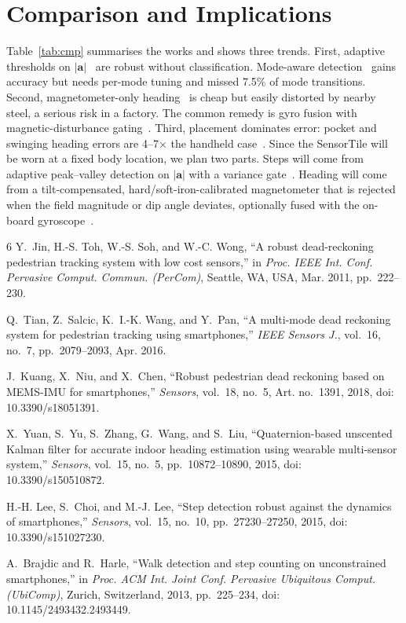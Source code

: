 \section{Comparison and Implications}
Table~\ref{tab:cmp} summarises the works and shows three trends. First,
adaptive thresholds on $|\mathbf{a}|$~\cite{lee2015} are robust without
classification. Mode-aware detection~\cite{tian2016} gains accuracy but
needs per-mode tuning and missed 7.5\% of mode transitions. Second,
magnetometer-only heading~\cite{jin2011} is cheap but easily distorted
by nearby steel, a serious risk in a factory. The common remedy is gyro
fusion with magnetic-disturbance gating~\cite{yuan2015,kuang2018}.
Third, placement dominates error: pocket and swinging heading errors are
4--7$\times$ the handheld case~\cite{kuang2018}. Since the SensorTile
will be worn at a fixed body location, we plan two parts. Steps will
come from adaptive peak--valley detection on $|\mathbf{a}|$ with a
variance gate~\cite{lee2015,brajdic2013}. Heading will come from a
tilt-compensated, hard/soft-iron-calibrated magnetometer that is
rejected when the field magnitude or dip angle deviates, optionally
fused with the on-board gyroscope~\cite{yuan2015,kuang2018}.

\begin{thebibliography}{6}
Y.~Jin, H.-S. Toh, W.-S. Soh, and W.-C. Wong, ``A robust dead-reckoning
pedestrian tracking system with low cost sensors,'' in \emph{Proc. IEEE
Int. Conf. Pervasive Comput. Commun. (PerCom)}, Seattle, WA, USA, Mar.
2011, pp.~222--230.

Q.~Tian, Z.~Salcic, K.~I.-K. Wang, and Y.~Pan, ``A multi-mode dead
reckoning system for pedestrian tracking using smartphones,'' \emph{IEEE
Sensors J.}, vol.~16, no.~7, pp.~2079--2093, Apr. 2016.

J.~Kuang, X.~Niu, and X.~Chen, ``Robust pedestrian dead reckoning based
on MEMS-IMU for smartphones,'' \emph{Sensors}, vol.~18, no.~5, Art.
no.~1391, 2018, doi: 10.3390/s18051391.

X.~Yuan, S.~Yu, S.~Zhang, G.~Wang, and S.~Liu, ``Quaternion-based
unscented Kalman filter for accurate indoor heading estimation using
wearable multi-sensor system,'' \emph{Sensors}, vol.~15, no.~5,
pp.~10872--10890, 2015, doi: 10.3390/s150510872.

H.-H. Lee, S.~Choi, and M.-J. Lee, ``Step detection robust against the
dynamics of smartphones,'' \emph{Sensors}, vol.~15, no.~10,
pp.~27230--27250, 2015, doi: 10.3390/s151027230.

A.~Brajdic and R.~Harle, ``Walk detection and step counting on
unconstrained smartphones,'' in \emph{Proc. ACM Int. Joint Conf.
Pervasive Ubiquitous Comput. (UbiComp)}, Zurich, Switzerland, 2013,
pp.~225--234, doi: 10.1145/2493432.2493449.
\end{thebibliography}


